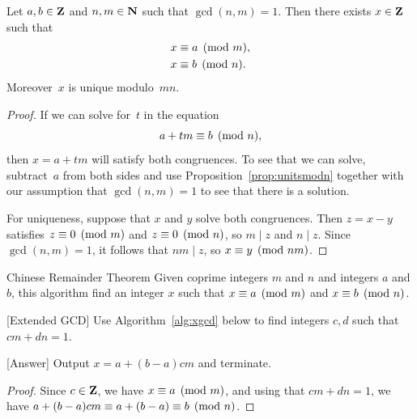\begin{theorem}\label{thm:crt}%
Let $a, b\in\mathbf{Z}$ and $n,m\in\mathbf{N}$ such that
$\gcd(n,m)=1$.  Then there exists $x\in\mathbf{Z}$ such that
\begin{align*}
x&\equiv a\pmod{m},\\
x&\equiv b\pmod{n}.
\end{align*}
Moreover~$x$ is unique modulo~$mn$.
\end{theorem}
\begin{proof}
If we can solve for~$t$ in the equation
$$
   a+tm \equiv b \pmod{n},
$$
then $x=a+tm$ will satisfy both congruences.
To see that we can solve, subtract~$a$ from
both sides and use Proposition~\ref{prop:unitsmodn}
together with our assumption that $\gcd(n,m)=1$  to see that
there is a solution.

For uniqueness, suppose that $x$ and $y$ solve both congruences.  Then
$z=x-y$ satisfies $z\equiv 0\pmod{m}$ and $z\equiv 0\pmod{n}$, so $m\mid
z$ and $n\mid z$.  Since $\gcd(n,m)=1$, it follows that $nm\mid z$, so
$x\equiv y\pmod{nm}$.
\end{proof}


\begin{algorithm}{Chinese Remainder Theorem}\label{alg:crt}
Given coprime integers $m$ and $n$ and integers $a$ and $b$,
this algorithm find an integer $x$ such that $x\equiv a\pmod{m}$
and $x\equiv b\pmod{n}$.
\begin{steps}
\item{}[Extended GCD] Use Algorithm~\ref{alg:xgcd} below
to find integers $c,d$ such that $cm+dn=1$.
\item{}[Answer] Output $x =a + (b-a)cm$ and terminate.
\end{steps}
\end{algorithm}
\begin{proof}
Since $c\in\mathbf{Z}$, we have $x\equiv a\pmod{m}$,
and using that $cm+dn=1$,  we have
$a + (b-a)cm \equiv a + (b-a) \equiv b\pmod{n}$.
\end{proof}

